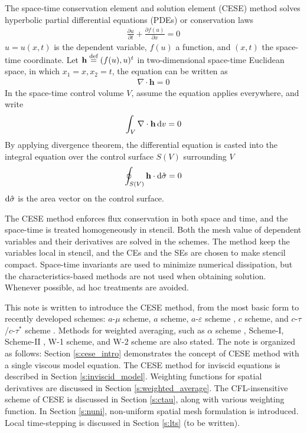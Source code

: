 \documentclass{turgon}
\begin{document}
The space-time conservation element and solution element (CESE) method solves
hyperbolic partial differential equations (PDEs) or conservation
laws \citep{lax_hyperbolic_1973}
\begin{align*}
  \frac{\partial u}{\partial t} + \frac{\partial f(u)}{\partial x} = 0
\end{align*}
$u = u(x, t)$ is the dependent variable, $f(u)$ a function, and $(x, t)$ the
space-time coordinate.  Let $\mathbf{h} \defeq (f(u),u)^t$ in two-dimensional
space-time Euclidean space, in which $x_1=x, x_2=t$, the equation can be
written as
\begin{align*}
  \nabla\cdot\mathbf{h} = 0
\end{align*}
In the space-time control volume $V$, assume the equation applies everywhere,
and write
\begin{align*}
  \int_V\nabla\cdot\mathbf{h}\mathop{}\!\mathrm{d} v = 0
\end{align*}
By applying divergence theorem, the differential equation is casted into the
integral equation over the control surface $S(V)$ surrounding $V$
\begin{align*}
  \oint_{S(V)}\mathbf{h}\cdot\mathop{}\!\mathrm{d}\hat{\sigma} = 0
\end{align*}
$\mathop{}\!\mathrm{d}\hat{\sigma}$ is the area vector on the control surface.

The CESE method enforces flux conservation in both space and time, and the
space-time is treated homogeneously in stencil.  Both the mesh value of
dependent variables and their derivatives are solved in the schemes.  The
method keep the variables local in stencil, and the CEs and the SEs are chosen
to make stencil compact.  Space-time invariants are used to minimize numerical
dissipation, but the characteristics-based methods are not used when obtaining
solution.  Whenever possible, ad hoc treatments are avoided.
\citep{chang_method_1995}

This note is written to introduce the CESE method, from the most basic form to
recently developed schemes: $a$-$\mu$ scheme, $a$ scheme, $a$-$\varepsilon$
scheme \citep{chang_method_1995}, $c$ scheme, and $c$-$\tau$/$c$-$\tau^*$
scheme \citep{chang_multi-dimensional_2003}.  Methods for weighted averaging,
such as $\alpha$ scheme \citep{chang_method_1995}, Scheme-I,
Scheme-II \citep{chang_courant_2002}, W-1 scheme, and W-2
scheme \citep{chang_multi-dimensional_2003} are also stated.  The note is
organized as follows: Section \ref{s:cese_intro} demonstrates the concept of
CESE method with a single viscous model equation.  The CESE method for inviscid
equations is described in Section \ref{s:inviscid_model}.  Weighting functions
for spatial derivatives are discussed in Section \ref{s:weighted_average}.  The
CFL-insensitive scheme of CESE is discussed in Section \ref{s:ctau}, along with
various weighting function.  In Section \ref{s:nuni}, non-uniform spatial mesh
formulation is introduced.  Local time-stepping is discussed in Section
\ref{s:lts} (to be written).
\end{document}
